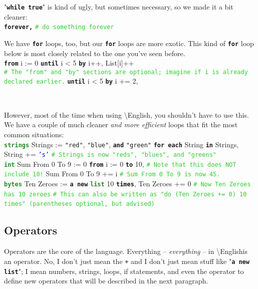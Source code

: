 \documentclass{article}
\newcommand{\English}{\textbackslash{}English}				%
\newcommand{\ssecl}[1]{\subsection{#1}\label{ssec:#1}}
\newcommand{\codecomment}[1]{\texttt{\textcolor{LimeGreen}{#1}}}
\newcommand{\commentline}[1]{\codecomment{\# #1}}
\newcommand{\type}[1]{\texttt{\textcolor{ForestGreen}{\textbf{#1}}}}
\newcommand{\common}[1]{\texttt{\textcolor{Mulberry}{\textbf{#1}}}}
\newcommand{\codestring}[1]{\texttt{\textcolor{NavyBlue}{"#1"}}}
\newcommand{\codechar}[1]{\texttt{\textcolor{Blue}{#1}}}
\newenvironment{code}[0]
{\ttfamily{}				%
\setlength\parindent{0cm}	%
~\\}
{\setlength\parindent{1cm}
~\\}
\begin{document}
\indent "\common{while true}" is kind of ugly, but sometimes necessary, so we made it a bit cleaner:
\begin{code}
\common{forever,}
\qquad{}\commentline{do something forever}
\end{code}

\indent We have \common{for} loops, too, but our \common{for} loops are more exotic. This kind of \common{for} loop below is most closely related to the one you've seen before.
\begin{code}
\common{from} i := 0 \common{until} i < 5 \common{by} i++,
\qquad{}List[i]++\\

\commentline{The "from" and "by" sections are optional; imagine if i is already declared earlier.}
\common{until} i < 5 \common{by} i += 2,
	
\end{code}

\indent However, most of the time when using \English{}, you shouldn't have to use this. We have a couple of much cleaner \emph{and more efficient} loops that fit the most common situations:
\begin{code}
\type{strings} Strings := \codestring{red}, \codestring{blue}, \common{and} \codestring{green}
\common{for each} String \common{in} Strings,
\qquad{}String += \codechar{'s'}
\commentline{Strings is now "reds", "blues", and "greens"}\\

\type{int} Sum From 0 To 9 := 0
\common{from} i := 0 \common{to} 10, \commentline{Note that this does NOT include 10!}
\qquad{}Sum From 0 To 9 += i
\commentline{Sum From 0 To 9 is now 45.}\\

\type{bytes} Ten Zeroes := \common{a new} \type{list}
10 \common{times},
\qquad{}Ten Zeroes += 0
\commentline{Now Ten Zeroes has 10 zeroes}
\commentline{This can also be written as "do (Ten Zeroes += 0) 10 times" (parentheses optional, but advised)}
\end{code}

\ssecl{Operators}
\indent Operators are the core of the language. Everything -- \emph{everything} -- in \English is an operator. No, I don't just mean the \texttt{+} and I don't just mean stuff like "\common{a new list}"; I mean numbers, strings, loops, if statements, and even the operator to define new operators that will be described in the next paragraph.
\end{document}
